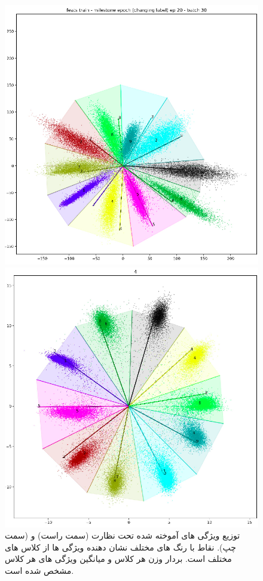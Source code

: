 \documentclass{article}
\begin{document}
\begin{figure}[h]
    \centering
    \begin{minipage}[b]{0.45\textwidth}
        \centering
        \includegraphics[width=\textwidth]{ce.png}
    \end{minipage}
    \hfill
    \begin{minipage}[b]{0.45\textwidth}
        \centering
        \includegraphics[width=\textwidth]{cl.png}
    \end{minipage}
    \caption{
    توزیع ویژگی های آموخته شده تحت نظارت  (سمت راست) و  (سمت چپ). نقاط با رنگ های مختلف نشان دهنده ویژگی ها از کلاس های مختلف است. بردار وزن هر کلاس و میانگین ویژگی های هر کلاس مشخص شده است.
    }
    \label{fig:sample-images}
\end{figure}
\end{document}
